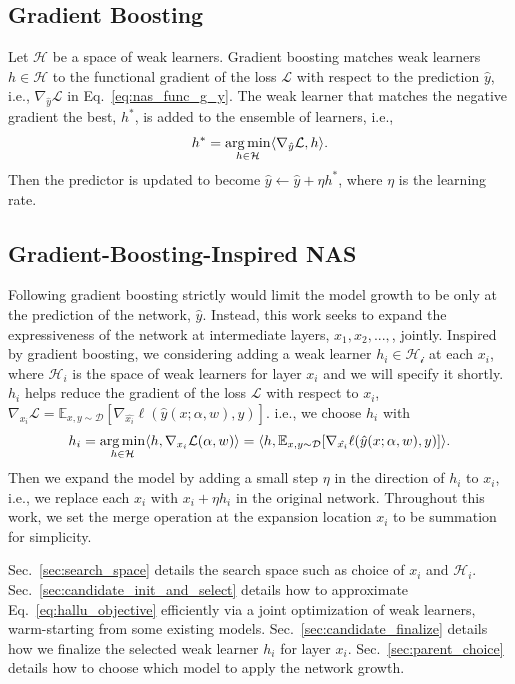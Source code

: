 \subsection{Gradient Boosting}
\label{sec:gb_review_nas}
Let $\mathcal{H}$ be a space of weak learners. 
Gradient boosting matches weak learners $h \in \mathcal{H}$ to 
the functional gradient of the loss $\mathcal{L}$ with respect to the prediction $\hat{y}$, 
i.e., $\nabla _{\hat{y}} \mathcal{L}$ in Eq.~\ref{eq:nas_func_g_y}.
The weak learner that matches the negative gradient the best, $h^*$, is added to the ensemble of learners, i.e.,
\begin{align}
h^* = \operatorname*{arg\,min} _{h \in \mathcal{H}} \langle \nabla _{\hat{y}} \mathcal{L}, h \rangle.
\end{align}
Then the predictor is updated to become $\hat{y} \leftarrow \hat{y} + \eta h^*$, where $\eta$ is the learning rate.

\subsection{Gradient-Boosting-Inspired NAS}
\label{sec:gb_nas}
Following gradient boosting strictly would limit the model growth to be only at the prediction of the network, $\hat{y}$. 
Instead, this work seeks to expand the expressiveness of the network at intermediate layers, $x_1, x_2,...,$, jointly.
Inspired by gradient boosting, we considering adding a weak learner $h_i \in \mathcal{H_i}$ at each $x_i$, where 
$\mathcal{H}_i$ is the space of weak learners for layer $x_i$ and we will specify it shortly. 
$h_i$ helps reduce the gradient of the loss $\mathcal{L}$ with respect to $x_i$, $\nabla _{x_i} \mathcal{L}  = \mathbb{E} _{x, y \sim \mathcal{D}} [ \nabla _{\hat{x_{i}}} \ell(\hat{y}(x ; \alpha, w), y) ]$.
i.e., we choose $h_i$ with 
\begin{align}
h_i = \operatorname*{arg\,min} _{h \in \mathcal{H}} \langle h, 
\nabla _{x_i} \mathcal{L} (\alpha, w) \rangle = \langle h, \mathbb{E} _{x, y \sim \mathcal{D}} [ \nabla _{\hat{x_{i}}} \ell(\hat{y}(x ; \alpha, w), y) ] \rangle.
\label{eq:hallu_objective}
\end{align}
Then we expand the model by adding a small step $\eta$ in the direction of $h_i$ to $x_i$, i.e., we replace each $x_i$ with $x_i + \eta h_i$ in the original network.
Throughout this work, we set the merge operation at the expansion location $x_i$ to be summation for simplicity.

Sec.~\ref{sec:search_space} details the search space such as choice of $x_i$ and $\mathcal{H}_i$. 
Sec.~\ref{sec:candidate_init_and_select} details how to approximate Eq.~\ref{eq:hallu_objective} efficiently via 
a joint optimization of weak learners, warm-starting from some existing models.
Sec.~\ref{sec:candidate_finalize} details how we finalize the selected weak learner $h_i$ for layer $x_i$.
Sec.~\ref{sec:parent_choice} details how to choose which model to apply the network growth.




